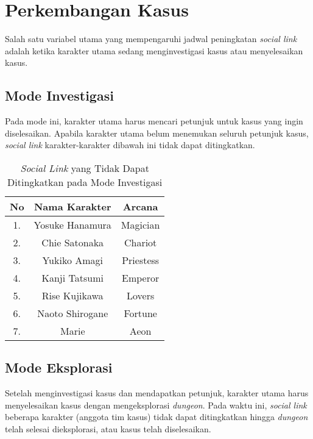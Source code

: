 \section{Perkembangan Kasus}
Salah satu variabel utama yang mempengaruhi jadwal peningkatan \textit{social link} adalah ketika karakter utama sedang menginvestigasi kasus atau menyelesaikan kasus.

\subsection{Mode Investigasi}
Pada mode ini, karakter utama harus mencari petunjuk untuk kasus yang ingin diselesaikan. Apabila karakter utama belum menemukan seluruh petunjuk kasus, \textit{social link} karakter-karakter dibawah ini tidak dapat ditingkatkan.
\begin{table}[htb]
    \begin{center}
        \begin{tabular}{ | c | c | c |}
            \hline
            No & Nama Karakter   & Arcana    \\
            \hline
            1. & Yosuke Hanamura & Magician  \\
            \hline
            2. & Chie Satonaka   & Chariot   \\
            \hline
            3. & Yukiko Amagi    & Priestess \\
            \hline
            4. & Kanji Tatsumi   & Emperor   \\
            \hline
            5. & Rise Kujikawa   & Lovers    \\
            \hline
            6. & Naoto Shirogane & Fortune   \\
            \hline
            7. & Marie           & Aeon      \\
            \hline
        \end{tabular}
    \end{center}
    \caption{\textit{Social Link} yang Tidak Dapat Ditingkatkan pada Mode Investigasi}
\end{table}


\subsection{Mode Eksplorasi}
Setelah menginvestigasi kasus dan mendapatkan petunjuk, karakter utama harus menyelesaikan kasus dengan mengeksplorasi \textit{dungeon}. Pada waktu ini, \textit{social link} beberapa karakter (anggota tim kasus) tidak dapat ditingkatkan hingga \textit{dungeon} telah selesai dieksplorasi, atau kasus telah diselesaikan.

